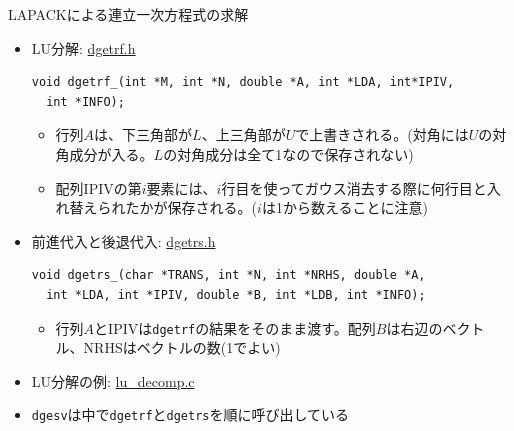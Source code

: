 \begin{frame}[t,fragile]{LAPACKによる連立一次方程式の求解}
  \begin{itemize}
  \item LU分解: \href{https://github.com/todo-group/computer-experiments/blob/master/exercise/include/dgetrf.h}{dgetrf.h}
\begin{lstlisting}
void dgetrf_(int *M, int *N, double *A, int *LDA, int*IPIV,
  int *INFO);
\end{lstlisting}
\begin{itemize}
\item 行列$A$は、下三角部が$L$、上三角部が$U$で上書きされる。(対角には$U$の対角成分が入る。$L$の対角成分は全て1なので保存されない)
\item 配列IPIVの第$i$要素には、$i$行目を使ってガウス消去する際に何行目と入れ替えられたかが保存される。($i$は1から数えることに注意)
\end{itemize}
  \item 前進代入と後退代入: \href{https://github.com/todo-group/computer-experiments/blob/master/exercise/include/dgetrs.h}{dgetrs.h}
\begin{lstlisting}
void dgetrs_(char *TRANS, int *N, int *NRHS, double *A,
  int *LDA, int *IPIV, double *B, int *LDB, int *INFO);
\end{lstlisting}
\begin{itemize}
\item 行列$A$とIPIVは{\tt dgetrf}の結果をそのまま渡す。配列$B$は右辺のベクトル、NRHSはベクトルの数(1でよい)
\end{itemize}
  \item LU分解の例: \href{https://github.com/todo-group/computer-experiments/blob/master/exercise/linear_system/lu_decomp.c}{lu\_decomp.c}
  \item {\tt dgesv}は中で{\tt dgetrf}と{\tt dgetrs}を順に呼び出している
  \end{itemize}
\end{frame}
